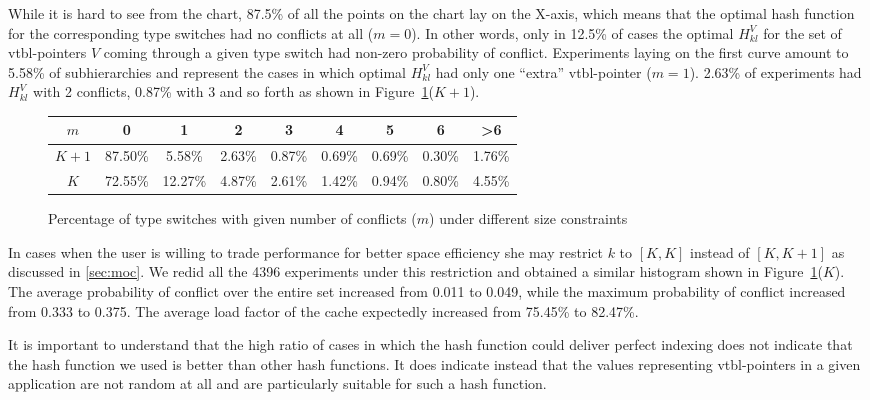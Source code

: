 While it is hard to see from the chart, 87.5\% of all the points on the chart 
lay on the X-axis, which means that the optimal hash function for the 
corresponding type switches had no conflicts at all ($m=0$). In other words, only in 12.5\% 
of cases the optimal $H_{kl}^V$ for the set of vtbl-pointers $V$ coming through 
a given type switch had non-zero probability of conflict. Experiments laying on 
the first curve amount to 5.58\% of subhierarchies and represent the cases in 
which optimal $H_{kl}^V$ had only one ``extra'' vtbl-pointer ($m=1$). 2.63\% of 
experiments had $H_{kl}^V$ with 2 conflicts, 0.87\% with 3 and so forth as shown 
in Figure~\ref{fig:size}($K+1$).

\begin{figure}[htbp]
\small
\begin{tabular}
{@{}c@{}||@{}c@{ }|@{}c@{ }|@{}c@{ }|@{}c@{ }|@{}c@{ }|@{}c@{ }|@{}c@{ }|@{}c@{ }}
\hline %
  $m$ &       0 &       1 &      2 &      3 &      4 &        5 &      6 & \textgreater 6 \\
\hline %
$K+1$ & 87.50\% &  5.58\% & 2.63\% & 0.87\% & 0.69\% & 0.69\% & 0.30\% & 1.76\% \\
\hline %
  $K$ & 72.55\% & 12.27\% & 4.87\% & 2.61\% & 1.42\% & 0.94\% & 0.80\% & 4.55\% 
\end{tabular}
\caption{Percentage of type switches with given number of conflicts ($m$) under different size constraints}
\label{fig:size}
\end{figure}

In cases when the user is willing to trade performance for better space 
efficiency she may restrict $k$ to $[K,K]$ instead of $[K,K+1]$ as discussed in 
\textsection\ref{sec:moc}. We redid all the 4396 experiments under this 
restriction and obtained a similar histogram shown in Figure~\ref{fig:size}($K$).
The average probability of conflict over the entire set increased from 0.011 to 
0.049, while the maximum probability of conflict increased from 0.333 to 0.375. 
The average load factor of the cache expectedly increased from 75.45\% to 82.47\%. 

It is important to understand that the high ratio of cases in which the hash 
function could deliver perfect indexing does not indicate that the hash function 
we used is better than other hash functions. It does indicate instead that the 
values representing vtbl-pointers in a given application are not random at all and 
are particularly suitable for such a hash function.

